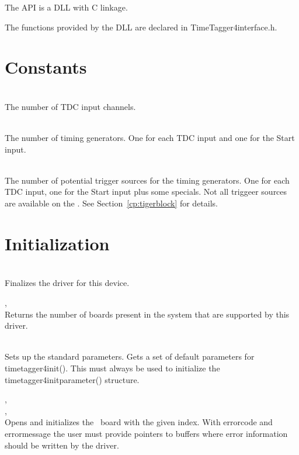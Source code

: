 The API is a DLL with C linkage.\par

The functions provided by the DLL are declared in \textsf{TimeTagger4\tu interface.h}.

\section{Constants}

	\\
	The number of TDC input channels.\par

	 \\
	The number of timing generators. One for each TDC input and one for the Start input.\par

	 \\
	The number of potential trigger sources for the timing generators. One for each TDC input, one for the Start input plus some specials. 
	Not all triggeer sources are available on the \deviceName . See Section~\ref{cp:tigerblock} for details.\par

\section{Initialization}
		\\
		Finalizes the driver for this device.

		, \\
		Returns the number of boards present in the system that are supported by this driver.\par

		\\
		Sets up the standard parameters. Gets a set of default parameters for \textsf{timetagger4\tu init()}. This must always be used to initialize the \textsf{timetagger4\tu init\tu parameter()} structure.\par

		, \\ , \\
		Opens and initializes the \deviceName\ board with the given index. 
		With \textsf{error\tu code} and \textsf{error\tu message} the user must provide pointers to buffers where error information should be written by the driver.\par

